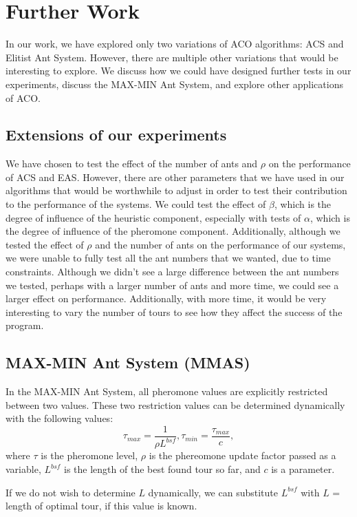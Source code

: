 \documentclass[11pt,twocolumn]{article}
\begin{document}

\section{Further Work}
In our work, we have explored only two variations of ACO algorithms: ACS and Elitist Ant System. However, there are multiple other variations that would be interesting to explore. We discuss how we could have designed further tests in our experiments, discuss the MAX-MIN Ant System, and explore other applications of ACO.

\subsection{Extensions of our experiments}
We have chosen to test the effect of the number of ants and $\rho$ on the performance of ACS and EAS. However, there are other parameters that we have used in our algorithms that would be worthwhile to adjust in order to test their contribution to the performance of the systems. We could test the effect of $\beta$, which is the degree of influence of the heuristic component, especially with tests of $\alpha$, which is the degree of influence of the pheromone component. Additionally, although we tested the effect of $\rho$ and the number of ants on the performance of our systems, we were unable to fully test all the ant numbers that we wanted, due to time constraints. Although we didn't see a large difference between the ant numbers we tested, perhaps with a larger number of ants and more time, we could see a larger effect on performance. Additionally, with more time, it would be very interesting to vary the number of tours to see how they affect the success of the program.

\subsection{MAX-MIN Ant System (MMAS)}
In the MAX-MIN Ant System, all pheromone values are explicitly restricted between two values. These two restriction values can be determined dynamically with the following values: \\
$$ \tau_{max} = \frac{1}{\rho L^{bsf}}, \tau_{min} = \frac{\tau_{max}}{c}, $$
where $\tau$ is the pheromone level, $\rho$ is the phereomone update factor passed as a variable, $L^{bsf}$ is the length of the best found tour so far, and $c$ is a parameter.

If we do not wish to determine $L$ dynamically, we can substitute $L^{bsf}$ with $L$ = length of optimal tour, if this value is known.
\end{document}
